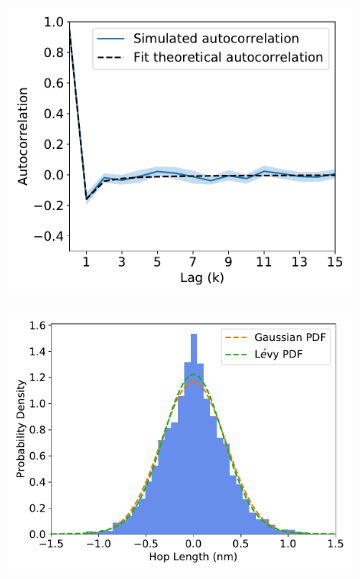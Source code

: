 \documentclass{article}
\begin{document}
\begin{figure}[htb!]
\begin{subfigure}{0.3\textwidth}
  \caption{}\label{fig:URE_powerlaw}
  \end{subfigure}
  \begin{subfigure}{0.3\textwidth}
  \includegraphics[width=\textwidth]{URE_hop_acf.pdf}
  \caption{}\label{fig:URE_hop_acf}
  \end{subfigure}
  \begin{subfigure}{0.3\textwidth}
  \includegraphics[width=\textwidth]{gaussian_levy_comparison_anomalous_GCL.pdf}
  \caption{}\label{fig:GCL_hop_distribution_comparison}
  \end{subfigure}
  \begin{subfigure}{0.3\textwidth}

\end{subfigure}
\end{figure}
\end{document}
